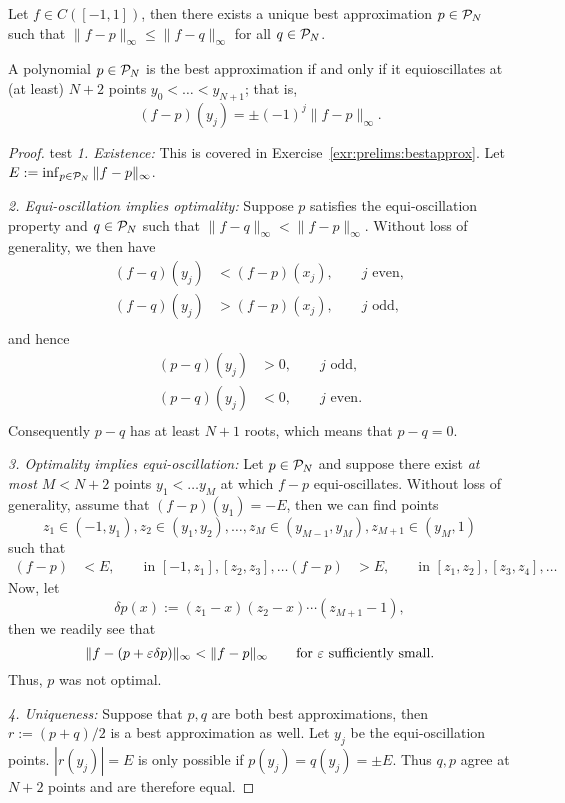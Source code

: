 \begin{theorem} \label{th:poly:bestapprox}
   Let $f \in C([-1,1])$, then there exists a unique best approximation 
   $p \in \mathcal{P}_N$ such that $\|f - p \|_\infty \leq \|f-q\|_\infty$ for 
   all $q \in \mathcal{P}_N$. 

   A polynomial $p \in \mathcal{P}_N$ is the best approximation if and only if 
   it equioscillates at (at least) $N+2$ points $y_0 < \dots < y_{N+1}$; 
   that is, 
   \[
      (f-p)(y_j) = \pm (-1)^j \|f-p\|_\infty.
   \] 
\end{theorem}
\begin{proof}
   test
   {\it 1. Existence: } This is covered in
   Exercise~\ref{exr:prelims:bestapprox}. Let $E := \inf_{p \in \mathcal{P}_N}
   \|f-p\|_\infty$.
   
   {\it 2. Equi-oscillation implies optimality: } Suppose $p$ satisfies 
   the equi-oscillation property and $q \in \mathcal{P}_N$ such that 
   $\|f-q\|_\infty < \|f-p\|_\infty$. Without loss of generality, we then have 
   \begin{align*}
      (f-q)(y_j) &< (f-p)(x_j), \qquad j \text{ even},  \\ 
      (f-q)(y_j) &> (f-p)(x_j), \qquad j \text{ odd}, \\ 
   \end{align*}
   and hence 
   \begin{align*}
      (p-q)(y_j) &> 0, \qquad j \text{ odd}, \\ 
      (p-q)(y_j) &< 0, \qquad j \text{ even}.  \\ 
   \end{align*}
   Consequently $p-q$ has at least $N+1$ roots, which means that $p - q = 0$.
      
   {\it 3. Optimality implies equi-oscillation: } Let $p \in \mathcal{P}_N$ and
   suppose there exist {\em at most} $M < N+2$ points $y_1 < \dots y_M$ at which
   $f-p$ equi-oscillates. Without loss of generality, assume that $(f-p)(y_1) =
   -E$, then we can find points  
   \[ 
      z_1 \in (-1, y_1), z_2 \in (y_1, y_2), \dots, 
      z_M \in (y_{M-1}, y_M), z_{M+1} \in (y_M, 1)
   \]
   such that 
   \begin{align*}
      (f-p) &< E, \qquad \text{in } [-1, z_1], [z_2, z_3], \dots 
      (f-p) &> E, \qquad \text{in } [z_1, z_2], [z_3, z_4], \dots 
   \end{align*}
   Now, let 
   \[
      \delta p(x) := (z_1 - x)(z_2-x)\cdots(z_{M+1}-1), 
   \]
   then we readily see that 
   \[
      \|f - (p + \varepsilon \delta p)\|_\infty < \|f - p\|_\infty
      \qquad \text{for $\varepsilon$ sufficiently small.}
   \]
   Thus, $p$ was not optimal. 
   
   {\it 4. Uniqueness: } Suppose that $p, q$ are both best approximations, then
   $r := (p+q)/2$ is a best approximation as well. Let $y_j$ be the
   equi-oscillation points. $|r(y_j)| = E$ is only possible if $p(y_j) = q(y_j)
   = \pm E$. Thus $q, p$ agree at $N+2$ points and are therefore equal.
\end{proof}

